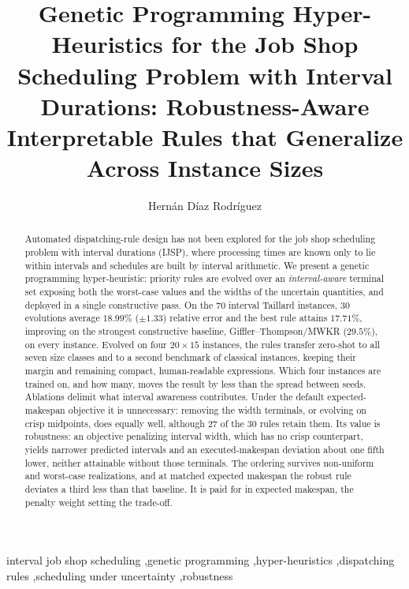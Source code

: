 \documentclass[review,authoryear,11pt]{elsarticle}
\newcommand{\rev}[1]{\textcolor{revcolor}{#1}}
\begin{document}
\begin{frontmatter}

\title{Genetic Programming Hyper-Heuristics for the Job Shop Scheduling
Problem with Interval Durations: Robustness-Aware Interpretable Rules
that Generalize Across Instance Sizes}

\author{Hern\'an D\'iaz Rodr\'iguez}

\begin{abstract}
Automated dispatching-rule design has not been explored for the job shop
scheduling problem with interval durations (IJSP), where processing
times are known only to lie within intervals and schedules are built by
interval arithmetic. We present a genetic programming
hyper-heuristic: priority rules are evolved over an
\emph{interval-aware} terminal set exposing both the worst-case values
and the widths of the uncertain quantities, and deployed in a single
constructive pass. On the 70 interval Taillard instances, 30
evolutions average $18.99\%$ ($\pm1.33$) relative error and the best
rule attains $17.71\%$, improving on the strongest constructive
baseline, Giffler--Thompson/MWKR ($29.5\%$), on every instance. Evolved on four $20{\times}15$ instances, the rules transfer
zero-shot to all seven size classes and to a second benchmark of
classical instances, keeping their margin and remaining compact,
human-readable expressions. \rev{Which four instances are trained on,
and how many, moves the result by less than the spread between seeds.}
Ablations delimit what interval awareness contributes.
\rev{Under the default expected-makespan objective it is unnecessary}:
removing the width terminals, or evolving on crisp midpoints, does
equally well\rev{, although 27 of the 30 rules retain them}. Its value
is robustness: an objective penalizing interval width, which has no
crisp counterpart, yields narrower predicted intervals and an
executed-makespan deviation about one fifth lower, neither attainable
without those terminals. \rev{The ordering survives non-uniform and
worst-case realizations, and at matched expected makespan the robust
rule deviates a third less than that baseline.} It is paid for in
expected makespan, the penalty weight setting the trade-off.
\end{abstract}

\begin{keyword}
interval job shop scheduling \sep genetic programming \sep hyper-heuristics
\sep dispatching rules \sep scheduling under uncertainty \sep robustness
\end{keyword}

\end{frontmatter}
\end{document}

